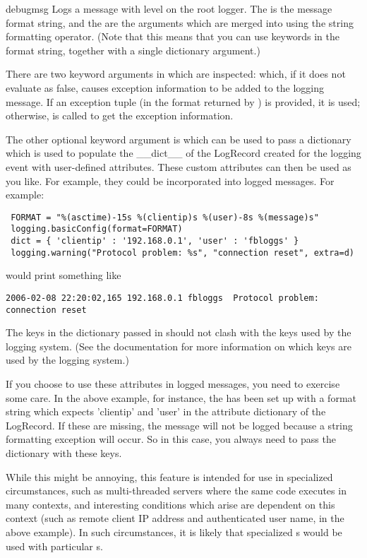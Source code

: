 \begin{funcdesc}{debug}{msg}
Logs a message with level  on the root logger.
The  is the message format string, and the  are the
arguments which are merged into  using the string formatting
operator. (Note that this means that you can use keywords in the
format string, together with a single dictionary argument.)

There are two keyword arguments in  which are inspected:
 which, if it does not evaluate as false, causes exception
information to be added to the logging message. If an exception tuple (in the
format returned by ) is provided, it is used;
otherwise,  is called to get the exception
information.

The other optional keyword argument is  which can be used to pass
a dictionary which is used to populate the __dict__ of the LogRecord created
for the logging event with user-defined attributes. These custom attributes
can then be used as you like. For example, they could be incorporated into
logged messages. For example:

\begin{verbatim}
 FORMAT = "%(asctime)-15s %(clientip)s %(user)-8s %(message)s"
 logging.basicConfig(format=FORMAT)
 dict = { 'clientip' : '192.168.0.1', 'user' : 'fbloggs' }
 logging.warning("Protocol problem: %s", "connection reset", extra=d)
\end{verbatim}

would print something like
\begin{verbatim}
2006-02-08 22:20:02,165 192.168.0.1 fbloggs  Protocol problem: connection reset
\end{verbatim}

The keys in the dictionary passed in  should not clash with the keys
used by the logging system. (See the  documentation for more
information on which keys are used by the logging system.)

If you choose to use these attributes in logged messages, you need to exercise
some care. In the above example, for instance, the  has been
set up with a format string which expects 'clientip' and 'user' in the
attribute dictionary of the LogRecord. If these are missing, the message will
not be logged because a string formatting exception will occur. So in this
case, you always need to pass the  dictionary with these keys.

While this might be annoying, this feature is intended for use in specialized
circumstances, such as multi-threaded servers where the same code executes
in many contexts, and interesting conditions which arise are dependent on this
context (such as remote client IP address and authenticated user name, in the
above example). In such circumstances, it is likely that specialized
s would be used with particular s.
\end{funcdesc}

